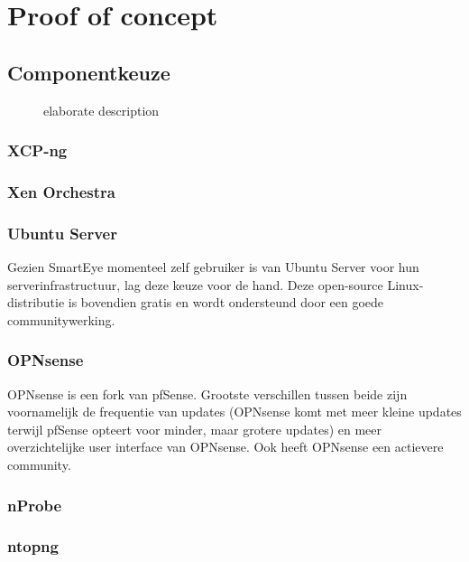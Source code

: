\chapter{Proof of concept}

\section{Componentkeuze}

\begin{figure}[!htbp]
    
    \caption[short description]{elaborate description}
    \label{fig:Componentkeuze}
\end{figure}

\subsection{XCP-ng}

\subsection{Xen Orchestra}

\subsection{Ubuntu Server}
Gezien SmartEye momenteel zelf gebruiker is van Ubuntu Server voor hun serverinfrastructuur, lag deze keuze voor de hand. Deze open-source Linux-distributie is bovendien gratis en wordt ondersteund door een goede communitywerking.

\subsection{OPNsense}
OPNsense is een fork van pfSense. Grootste verschillen tussen beide zijn voornamelijk de frequentie van updates (OPNsense komt met meer kleine updates terwijl pfSense opteert voor minder, maar grotere updates) en meer overzichtelijke user interface van OPNsense. Ook heeft OPNsense een actievere community.

\subsection{nProbe}

\subsection{ntopng}

